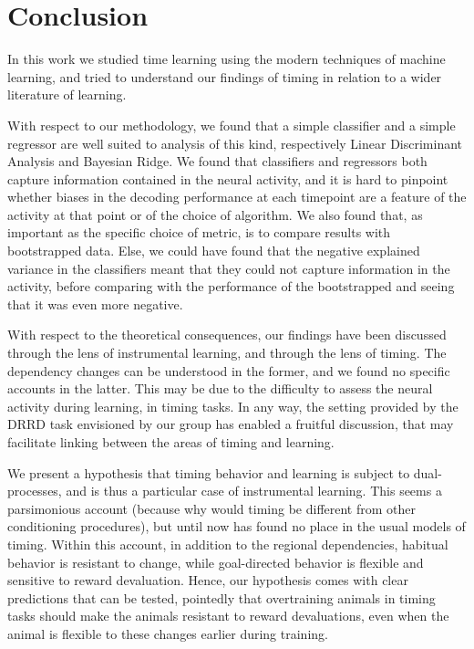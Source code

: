 

\chapter{Conclusion}
\label{chap:conclusion}

In this work we studied time learning using the modern techniques of machine learning, and tried to understand our findings of timing in relation to a wider literature of learning.

With respect to our methodology, we found that a simple classifier and a simple regressor are well suited to analysis of this kind, respectively Linear Discriminant Analysis and Bayesian Ridge. We found that classifiers and regressors both capture information contained in the neural activity, and it is hard to pinpoint whether biases in the decoding performance at each timepoint are a feature of the activity at that point or of the choice of algorithm. We also found that, as important as the specific choice of metric, is to compare results with bootstrapped data. Else, we could have found that the negative explained variance in the classifiers meant that they could not capture information in the activity, before comparing with the performance of the bootstrapped and seeing that it was even more negative.

With respect to the theoretical consequences, our findings have been discussed through the lens of instrumental learning, and through the lens of timing. The dependency changes can be understood in the former, and we found no specific accounts in the latter. This may be due to the difficulty to assess the neural activity during learning, in timing tasks. In any way, the setting provided by the DRRD task envisioned by our group has enabled a fruitful discussion, that may facilitate linking between the areas of timing and learning.

We present a hypothesis that timing behavior and learning is subject to dual-processes, and is thus a particular case of instrumental learning. This seems a parsimonious account (because why would timing be different from other conditioning procedures), but until now has found no place in the usual models of timing. Within this account, in addition to the regional dependencies, habitual behavior is resistant to change, while goal-directed behavior is flexible and sensitive to reward devaluation. Hence, our hypothesis comes with clear predictions that can be tested, pointedly that overtraining animals in timing tasks should make the animals resistant to reward devaluations, even when the animal is flexible to these changes earlier during training. 

